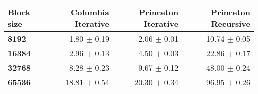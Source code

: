 \begin{tabular}{lrrr}\toprule
\textbf{Block size}  & \textbf{Columbia Iterative} & \textbf{Princeton Iterative} & \textbf{Princeton Recursive}\\\midrule
\textbf{8192}  & 1.80 $\pm$ 0.19 & 2.06 $\pm$ 0.01 & 10.74 $\pm$ 0.05\\
\textbf{16384}  & 2.96 $\pm$ 0.13 & 4.50 $\pm$ 0.03 & 22.86 $\pm$ 0.17\\
\textbf{32768}  & 8.28 $\pm$ 0.23 & 9.67 $\pm$ 0.12 & 48.00 $\pm$ 0.24\\
\textbf{65536} & 18.81 $\pm$ 0.54 & 20.30 $\pm$ 0.34 & 96.95 $\pm$ 0.26\\
\bottomrule
\end{tabular}
